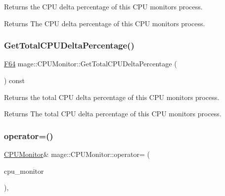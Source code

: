 Returns the C\+PU delta percentage of this C\+PU monitor\textquotesingle{}s process.

\begin{DoxyReturn}{Returns}
The C\+PU delta percentage of this C\+PU monitor\textquotesingle{}s process. 
\end{DoxyReturn}
\mbox{\label{classmage_1_1_c_p_u_monitor_aec7712bcef92b93d368c312168ab56bd}} 
\subsubsection{\texorpdfstring{Get\+Total\+C\+P\+U\+Delta\+Percentage()}{GetTotalCPUDeltaPercentage()}}
{\footnotesize\ttfamily \mbox{\hyperlink{namespacemage_ad26233bbec640deda836e572c1a23708}{F64}} mage\+::\+C\+P\+U\+Monitor\+::\+Get\+Total\+C\+P\+U\+Delta\+Percentage (\begin{DoxyParamCaption}{ }\end{DoxyParamCaption}) const\hspace{0.3cm}{\ttfamily [noexcept]}}

Returns the total C\+PU delta percentage of this C\+PU monitor\textquotesingle{}s process.

\begin{DoxyReturn}{Returns}
The total C\+PU delta percentage of this C\+PU monitor\textquotesingle{}s process. 
\end{DoxyReturn}
\mbox{\label{classmage_1_1_c_p_u_monitor_a878cc9fd170e6c34ee28f06591b06eeb}} 
\subsubsection{\texorpdfstring{operator=()}{operator=()}\hspace{0.1cm}{\footnotesize\ttfamily [1/2]}}
{\footnotesize\ttfamily \mbox{\hyperlink{classmage_1_1_c_p_u_monitor}{C\+P\+U\+Monitor}}\& mage\+::\+C\+P\+U\+Monitor\+::operator= (\begin{DoxyParamCaption}\item[{const \mbox{\hyperlink{classmage_1_1_c_p_u_monitor}{C\+P\+U\+Monitor}} \&}]{cpu\+\_\+monitor }\end{DoxyParamCaption})\hspace{0.3cm}{\ttfamily [default]}, {\ttfamily [noexcept]}}

